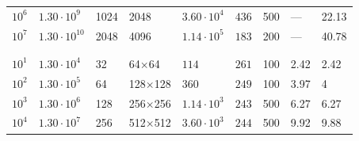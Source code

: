 \documentclass[aps, pre, onecolumn, nofootinbib, notitlepage, groupedaddress, amsfonts, amssymb, amsmath, longbibliography]{revtex4-1}
\begin{document}
\begin{table}
\begin{center}
\begin{tabularx}{\textwidth}{ X X X X | X X X | X X }
$10^6$	&	$1.30 \cdot 10^9$	&	1024	&	2048	&	$3.60 \cdot 10^4$	&	$436$	&	500	&	---	&	22.13	\\
$10^7$	&	$1.30 \cdot 10^{10}$	&	2048	&	4096	&	$1.14 \cdot 10^5$	&	$183$	&	200	&	---	&	40.78	\\
\\ \hline \hline \\																	
$10^1$	&	$1.30 \cdot 10^4$	&	32	&	64$\times$64	&	$114$	&	$261$	&	100	&	2.42	&	2.42	\\
$10^2$	&	$1.30 \cdot 10^5$	&	64	&	128$\times$128	&	$360$	&	$249$	&	100	&	3.97	&	4	\\
$10^3$	&	$1.30 \cdot 10^6$	&	128	&	256$\times$256	&	$1.14 \cdot 10^3$	&	$243$	&	500	&	6.27	&	6.27	\\
$10^4$	&	$1.30 \cdot 10^7$	&	256	&	512$\times$512	&	$3.60 \cdot 10^3$	&	$244$	&	500	&	9.92	&	9.88	\\
\hline																	
\end{tabularx}
\end{center}
\end{table}






\end{document}
